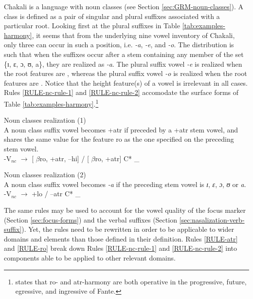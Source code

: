 Chakali is a language with
noun classes (see Section \ref{sec:GRM-noun-classes}). A class is defined as a
pair of singular and plural suffixes
associated with
a particular root.  Looking first at the plural suffixes in Table
\ref{tab:examples-harmony}, it seems that from the underlying nine vowel
inventory of Chakali, only three can occur in such a position, i.e. {\it -a}, 
{\it 
-e},  and {\it -o}. The distribution is such that  when the suffixes occur 
after a
stem containing any member of the set \{ɪ, ɛ, ɔ, ʊ, a\},  they are realized as
{\it -a}.  The plural suffix vowel {\it -e} is realized when the root features 
are
{\sc [+atr, --ro]}, whereas the plural suffix vowel {\it -o} is realized when 
the
root features are {\sc [+atr, +ro]}.  Notice that the height feature(s) of a
vowel is irrelevant in all cases.  Rules \ref{RULE-nc-rule-1} and
\ref{RULE-nc-rule-2} accomodate the surface forms of Table
\ref{tab:examples-harmony}.\footnote{\citet[19, 32--33]{Okee03} states that {\sc
ro}- and {\sc atr}-harmony are both operative in the progressive, future,
egressive, and ingressive of Fante.}


\begin{Rule}\label{RULE-nc-rule-1}{\rm Noun classes realization (1)}\\
A noun class suffix vowel becomes {\sc +atr} if preceded by a {\sc +atr}
stem vowel, and shares the same value for the
feature {\sc ro}  as the one specified on the preceding stem vowel. \\
-V$_{nc}$  $\rightarrow$ [ $\beta${\sc ro},  {\sc +atr},  {\sc --hi}] 
 / [ 
$\beta${\sc ro},
{\sc +atr}] C* \_

\end{Rule}


\begin{Rule}\label{RULE-nc-rule-2}{\rm Noun classes realization (2)}\\
A noun class suffix vowel becomes {\it -a} if the preceding stem vowel is 
{\it ɪ},
{\it ɛ}, {\it ɔ}, {\it ʊ} or {\it a}.\\
-V$_{nc}$ $\rightarrow$ {\sc +lo}  / {\sc --atr} C* \_ 
\end{Rule}


The same rules may be used to account for the vowel
quality of the focus marker (Section \ref{sec:focus-forms}) and  the verbal
suffixes (Section \ref{sec:nasalization-verb-suffix}). Yet, the rules need to
be rewritten in order to be  applicable to wider domains and elements than
those defined in their definition. Rules \ref{RULE-atr} and \ref{RULE-ro} break
down Rules \ref{RULE-nc-rule-1} and \ref{RULE-nc-rule-2} into components able to
be applied to other relevant domains.



